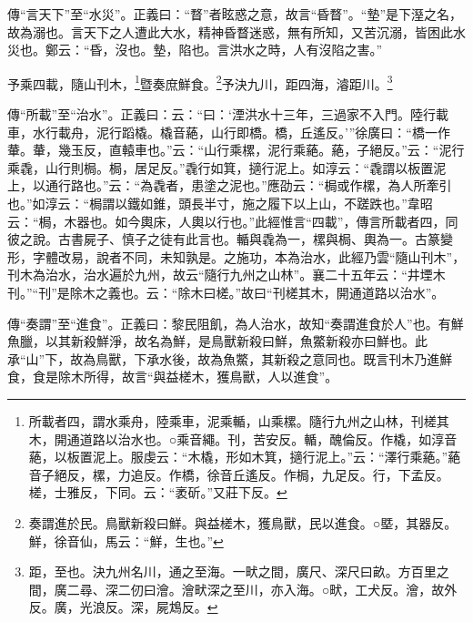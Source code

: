 {\noindent\zhuan{}\fzbyks 傳“言天下”至“水災”。正義曰：“瞀”者眩惑之意，故言“昏瞀”。“墊”是下溼之名，故為溺也。言天下之人遭此大水，精神昏瞀迷惑，無有所知，又苦沉溺，皆困此水災也。鄭云：“昏，沒也。墊，陷也。言洪水之時，人有沒陷之害。” \par}

予乘四載，隨山刊木，\footnote{所載者四，謂水乘舟，陸乘車，泥乘輴，山乘樏。隨行九州之山林，刊槎其木，開通道路以治水也。○乘音繩。刊，苦安反。輴，醜倫反。作橇，如淳音蕝，以板置泥上。服虔云：“木橇，形如木箕，擿行泥上。”云：“澤行乘蕝。”蕝音子絕反，樏，力追反。作橋，徐音丘遙反。作梮，九足反。行，下孟反。槎，士雅反，下同。云：“袤斫。”又莊下反。}暨奏庶鮮食。\footnote{奏謂進於民。鳥獸新殺曰鮮。與益槎木，獲鳥獸，民以進食。○塈，其器反。鮮，徐音仙，馬云：“鮮，生也。”}予決九川，距四海，濬距川。\footnote{距，至也。決九州名川，通之至海。一畎之間，廣尺、深尺曰畝。方百里之間，廣二尋、深二仞曰澮。澮畎深之至川，亦入海。○畎，工犬反。澮，故外反。廣，光浪反。深，屍鴆反。}


{\noindent\zhuan{}\fzbyks 傳“所載”至“治水”。正義曰：云：“曰：‘湮洪水十三年，三過家不入門。陸行載車，水行載舟，泥行蹈橇。橇音蕝，山行即橋。橋，丘遙反。’”徐廣曰：“橋一作輂。輂，幾玉反，直轅車也。”云：“山行乘樏，泥行乘蕝。蕝，子絕反。”云：“泥行乘毳，山行則梮。梮，居足反。”毳行如箕，擿行泥上。如淳云：“毳謂以板置泥上，以通行路也。”云：“為毳者，患塗之泥也。”應劭云：“梮或作樏，為人所牽引也。”如淳云：“梮謂以鐵如錐，頭長半寸，施之履下以上山，不蹉跌也。”韋昭云：“梮，木器也。如今輿床，人輿以行也。”此經惟言“四載”，傳言所載者四，同彼之說。古書屍子、慎子之徒有此言也。輴與毳為一，樏與梮、輿為一。古篆變形，字體改易，說者不同，未知孰是。之施功，本為治水，此經乃雲“隨山刊木”，刊木為治水，治水遍於九州，故云“隨行九州之山林”。襄二十五年云：“井堙木刊。”“刊”是除木之義也。云：“除木曰槎。”故曰“刊槎其木，開通道路以治水”。\par}

{\noindent\zhuan{}\fzbyks 傳“奏謂”至“進食”。正義曰：黎民阻飢，為人治水，故知“奏謂進食於人”也。有鮮魚臘，以其新殺鮮淨，故名為鮮，是鳥獸新殺曰鮮，魚鱉新殺亦曰鮮也。此承“山”下，故為鳥獸，下承水後，故為魚鱉，其新殺之意同也。既言刊木乃進鮮食，食是除木所得，故言“與益槎木，獲鳥獸，人以進食”。 \par}

